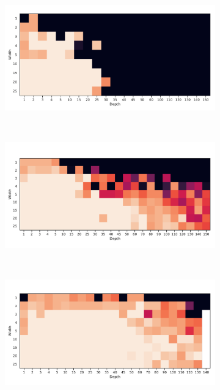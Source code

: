 \begin{figure}[h!]
  \centering
    \begin{subfigure}[b]{0.3\textwidth}
        \includegraphics[width=\textwidth]{img/moons_grid/acc-relu.pdf}
        \caption{\ReLU}
        \label{fig:moons_grid_relu}
    \end{subfigure}
    ~ %
    \centering
    \begin{subfigure}[b]{0.3\textwidth}
        \includegraphics[width=\textwidth]{img/moons_grid/acc-relu-bn.pdf}
        \caption{\ReLUBN}
        \label{fig:moons_grid_relubn}
    \end{subfigure}
    ~ %
    \centering
    \begin{subfigure}[b]{0.3\textwidth}
        \includegraphics[width=\textwidth]{img/moons_grid/acc-sep-up-0-0001.pdf}

\end{subfigure}
\end{figure}
